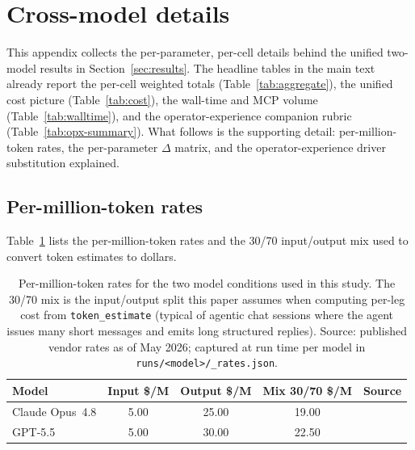 \section{Cross-model details}\label{app:cross-model}

This appendix collects the per-parameter, per-cell details behind the
unified two-model results in Section~\ref{sec:results}. The headline
tables in the main text already report the per-cell weighted totals
(Table~\ref{tab:aggregate}), the unified cost picture
(Table~\ref{tab:cost}), the wall-time and MCP volume
(Table~\ref{tab:walltime}), and the operator-experience companion
rubric (Table~\ref{tab:opx-summary}). What follows is the supporting
detail: per-million-token rates, the per-parameter $\Delta$ matrix,
and the operator-experience driver substitution explained.

\subsection{Per-million-token rates}

Table~\ref{tab:rate-substitution} lists the per-million-token rates and
the 30/70 input/output mix used to convert token estimates to dollars.

\begin{table}[h]
\centering
\caption{Per-million-token rates for the two model conditions used in
this study. The 30/70 mix is the input/output split this paper assumes
when computing per-leg cost from \texttt{token\_estimate} (typical of
agentic chat sessions where the agent issues many short messages and
emits long structured replies). Source: published vendor rates as of
May 2026; captured at run time per model in
\texttt{runs/<model>/\_rates.json}.}
\label{tab:rate-substitution}
\renewcommand{\arraystretch}{1.05}
\setlength{\tabcolsep}{6pt}
\begin{tabular}{lcccc}
\toprule
Model & Input \$/M & Output \$/M & Mix 30/70 \$/M & Source \\
\midrule
Claude Opus~4.8 &  5.00 & 25.00 & 19.00  & \citet{anthropic2026claude48} \\
GPT-5.5         &  5.00 & 30.00 & 22.50  & \citet{openai2026gpt55} \\
\bottomrule
\end{tabular}
\end{table}

